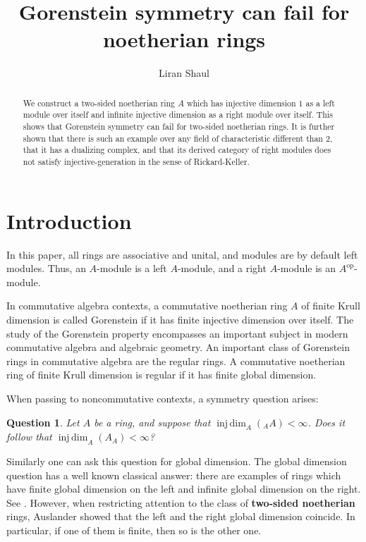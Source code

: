\documentclass{amsart}
\title{Gorenstein symmetry can fail for noetherian rings}
\author{Liran Shaul}
\newtheorem{que}[cthm]{Question}
\theoremstyle{definition}
\newcommand{\opn}{\operatorname}
\newcommand{\injdim}{\operatorname{inj\,dim}}
\numberwithin{equation}{section}
\begin{document}
\begin{abstract}

We construct a two-sided noetherian ring $A$ which has injective dimension $1$ as a left module over itself and infinite injective dimension as a right module over itself. 
This shows that Gorenstein symmetry can fail for two-sided noetherian rings.
It is further shown that there is such an example over any field of characteristic different than $2$,
that it has a dualizing complex, 
and that its derived category of right modules does not satisfy injective-generation in the sense of Rickard-Keller.
\end{abstract}


\maketitle

\setcounter{tocdepth}{1}
\tableofcontents

\setcounter{section}{-1}
\section{Introduction}

In this paper, all rings are associative and unital,
and modules are by default left modules. 
Thus, an $A$-module is a left $A$-module,
and a right $A$-module is an $A^{\opn{op}}$-module.

In commutative algebra contexts, a commutative noetherian ring $A$ of finite Krull dimension is called Gorenstein if it has finite injective dimension over itself. The study of the Gorenstein property encompasses an important subject in modern commutative algebra and algebraic geometry.
An important class of Gorenstein rings in commutative algebra are the regular rings. A commutative noetherian ring of finite Krull dimension is regular if it has finite global dimension.

When passing to noncommutative contexts, a symmetry question arises:

\begin{que}
Let $A$ be a ring, and suppose that $\injdim_A( \phantom{ }_A A) < \infty$.
Does it follow that $\injdim_A (A_A) < \infty$?
\end{que}

Similarly one can ask this question for global dimension.
The global dimension question has a well known classical answer:
there are examples of rings which have finite global dimension on the left and infinite global dimension on the right. See \cite{Jat}. 
However, when restricting attention to the class of \textbf{two-sided noetherian} rings, Auslander showed \cite[Corollary 5]{Aus} that the left and the right global dimension coincide. In particular, if one of them is finite, then so is the other one.
\end{document}
